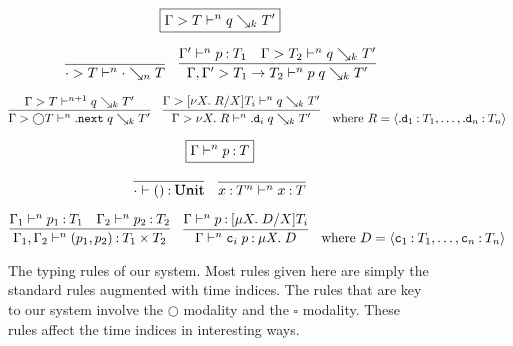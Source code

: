 \documentclass[acmsmall, natbib=false]{acmart}
\renewcommand{\circle}{\bigcirc}
\newcommand{\always}{\square}
\renewcommand{\next}{\mathtt{.next}}
\renewcommand{\synth}{\searrow}
\newcommand{\ctor}{\mathtt{c}}
\newcommand{\obs}{\mathtt{.d}}
\begin{document}
\begin{figure}[ht]
  \begin{equation*}
    \boxed{\Gamma > T \proves^n q \synth_k T^\prime}
  \end{equation*}

  \begin{equation*}
    \infer{
      \cdot > T \proves^n \cdot \synth_n T
    }{}
    \quad
    \infer{
      \Gamma, \Gamma^\prime > T_1 \to T_2 \proves^n p\; q \synth_k T^\prime
    }{
      \Gamma^\prime \proves^n p \hastype T_1
      &
      \Gamma > T_2 \proves^n q \synth_k T^\prime
    }
  \end{equation*}

  \begin{equation*}
    \infer{
      \Gamma > \circle T \proves^n \next\; q \synth_k T^\prime
    }{
      \Gamma > T \proves^{n+1} q \synth_k T^\prime
    }
    \quad
    \infer{
      \Gamma > \nu X.\; R \proves^n \obs_i\; q \synth_k T^\prime
    }{
      \Gamma > [\nu X.\; R/X]T_i \proves^n q \synth_k T^\prime
    }
    \quad
    \text{%
      where
      $R =
      \langle
      \obs_1 \hastype T_1, \ldots, \obs_n \hastype T_n
      \rangle$
    }
  \end{equation*}

  \begin{equation*}
    \boxed{\Gamma \vdash^n p \mathbin{:} T}
  \end{equation*}

  \begin{equation*}
    \infer{
      \cdot \proves () \hastype \mathqd{Unit}
    }{}
    \quad
    \infer{
      x \hastype T^n \proves^n x \hastype T
    }{}
  \end{equation*}

  \begin{equation*}
    \infer{
      \Gamma_1, \Gamma_2 \proves^n (p_1, p_2) \hastype T_1 \times T_2
    }{
      \Gamma_1 \proves^n p_1 \hastype T_1
      &
      \Gamma_2 \proves^n p_2 \hastype T_2
    }
    \quad
    \infer{
      \Gamma \proves^n \ctor_i\; p \hastype \mu X.\; D
    }{
      \Gamma \proves^n p \hastype [\mu X.\; D/X]T_i
    }
    \quad
    \text{%
      where $D =
      \langle
      \ctor_1 \hastype T_1, \ldots, \ctor_n \hastype T_n
      \rangle$
    }
  \end{equation*}

  \caption{%
    The typing rules of our system.
    Most rules given here are simply the standard rules augmented with time
    indices.
    The rules that are key to our system involve the $\circle$ modality and the
    $\always$ modality.
    These rules affect the time indices in interesting ways.
  }
  \label{fig:types}
\end{figure}
\end{document}
